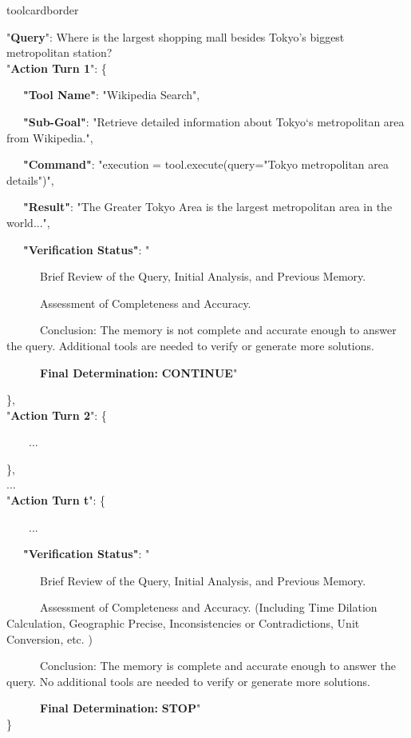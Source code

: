 \begin{custombox}[title=Example {Memory} Entry]{toolcardborder}
\begin{simplecode}
"\textbf{Query}": Where is the largest shopping mall besides Tokyo’s biggest metropolitan station? \\

"\textbf{Action Turn 1}": \{

    \ \ \ \textbf{"Tool Name"}: "Wikipedia Search",
    
    \ \ \  \textbf{"Sub-Goal"}: "Retrieve detailed information about Tokyo‘s metropolitan area from Wikipedia.",
    
    \ \ \ \textbf{"Command"}: "execution = tool.execute(query="Tokyo metropolitan area details")",
    
    \ \ \ \textbf{"Result"}: "The Greater Tokyo Area is the largest metropolitan area in the world...",

    \ \ \  \textbf{"Verification Status"}: "
    
    \ \ \ \ \ \  Brief Review of the Query, Initial Analysis, and Previous Memory.
    
    \ \ \ \ \ \  Assessment of Completeness and Accuracy.
    
    \ \ \ \ \ \ Conclusion: The memory is not complete and accurate enough to answer the query. Additional tools are needed to verify or generate more solutions.
    
    \ \ \ \ \ \  \textbf{Final Determination:} \textbf{CONTINUE}"
    
\},\\

"\textbf{Action Turn 2}": \{

\ \ \ \ ...

\},\\

...\\

"\textbf{Action Turn t}": \{

\ \ \ \ ...

\ \ \  \textbf{"Verification Status"}: "
    
    \ \ \ \ \ \ Brief Review of the Query, Initial Analysis, and Previous Memory.
    
    \ \ \ \ \ \  Assessment of Completeness and Accuracy. (Including Time Dilation Calculation, Geographic Precise, Inconsistencies or Contradictions, Unit Conversion, etc. )
    
    \ \ \ \ \ \ Conclusion: The memory is complete and accurate enough to answer the query. No additional tools are needed to verify or generate more solutions.
    
    \ \ \ \ \ \  \textbf{Final Determination:} \textbf{STOP}"
\\\}
\end{simplecode}
\end{custombox}

